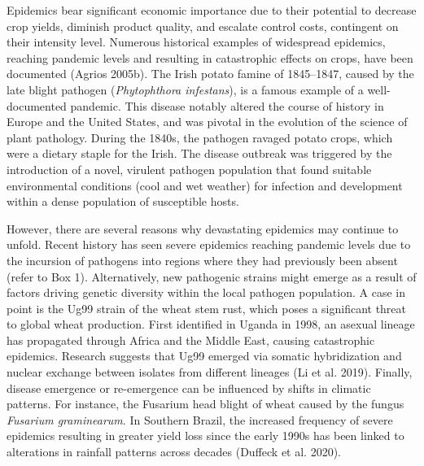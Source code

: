 \documentclass[
  letterpaper,
  DIV=11,
  numbers=noendperiod]{scrreprt}
\begin{document}
Epidemics bear significant economic importance due to their potential to
decrease crop yields, diminish product quality, and escalate control
costs, contingent on their intensity level. Numerous historical examples
of widespread epidemics, reaching pandemic levels and resulting in
catastrophic effects on crops, have been documented (Agrios 2005b). The
Irish potato famine of 1845--1847, caused by the late blight pathogen
(\emph{Phytophthora infestans}), is a famous example of a
well-documented pandemic. This disease notably altered the course of
history in Europe and the United States, and was pivotal in the
evolution of the science of plant pathology. During the 1840s, the
pathogen ravaged potato crops, which were a dietary staple for the
Irish. The disease outbreak was triggered by the introduction of a
novel, virulent pathogen population that found suitable environmental
conditions (cool and wet weather) for infection and development within a
dense population of susceptible hosts.

However, there are several reasons why devastating epidemics may
continue to unfold. Recent history has seen severe epidemics reaching
pandemic levels due to the incursion of pathogens into regions where
they had previously been absent (refer to Box 1). Alternatively, new
pathogenic strains might emerge as a result of factors driving genetic
diversity within the local pathogen population. A case in point is the
Ug99 strain of the wheat stem rust, which poses a significant threat to
global wheat production. First identified in Uganda in 1998, an asexual
lineage has propagated through Africa and the Middle East, causing
catastrophic epidemics. Research suggests that Ug99 emerged via somatic
hybridization and nuclear exchange between isolates from different
lineages (Li et al. 2019). Finally, disease emergence or re-emergence
can be influenced by shifts in climatic patterns. For instance, the
Fusarium head blight of wheat caused by the fungus \emph{Fusarium
graminearum}. In Southern Brazil, the increased frequency of severe
epidemics resulting in greater yield loss since the early 1990s has been
linked to alterations in rainfall patterns across decades (Duffeck et
al. 2020).
\end{document}
